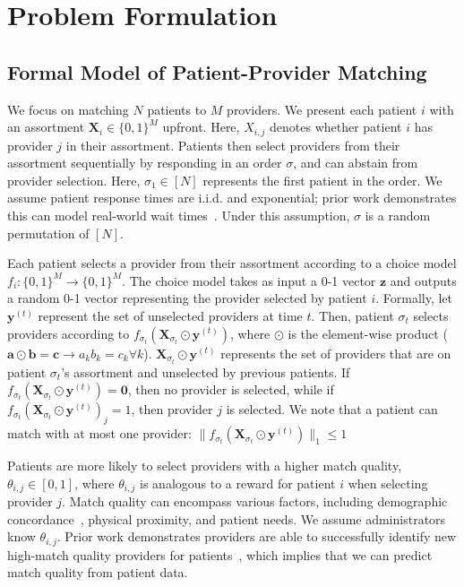 \section{Problem Formulation}
\label{sec:problem}

\subsection{Formal Model of Patient-Provider Matching}
\label{sec:model}
We focus on matching $N$ patients to $M$ providers. 
We present each patient $i$ with an assortment $\mathbf{X}_{i} \in \{0,1\}^{M}$ upfront.
Here, $X_{i,j}$ denotes whether patient $i$ has provider $j$ in their assortment. 
Patients then select providers from their assortment sequentially by responding in an order $\sigma$, and can abstain from provider selection. 
Here, $\sigma_{1} \in [N]$ represents the first patient in the order. 
We assume patient response times are i.i.d. and exponential; prior work demonstrates this can model real-world wait times~\citep{queueing_theory}. 
Under this assumption, $\sigma$ is a random permutation of $[N]$. 

Each patient selects a provider from their assortment according to a choice model $f_{i}: \{0,1\}^{M} \rightarrow \{0,1\}^{M}$. 
The choice model takes as input a 0-1 vector $\mathbf{z}$ and outputs a random 0-1 vector representing the provider selected by patient $i$. 
Formally, let $\mathbf{y}^{(t)}$ represent the set of unselected providers at time $t$. 
Then, patient $\sigma_{t}$ selects providers according to $f_{\sigma_{t}}(\mathbf{X}_{\sigma_{t}} \odot \mathbf{y}^{(t)})$, where $\odot$ is the element-wise product ($\mathbf{a} \odot \mathbf{b} = \mathbf{c} \rightarrow a_{k} b_{k} = c_{k} \forall k$). 
$\mathbf{X}_{\sigma_{t}} \odot \mathbf{y}^{(t)}$ represents the set of providers that are on patient $\sigma_{t}$'s assortment and unselected by previous patients. 
If $f_{\sigma_{t}}(\mathbf{X}_{\sigma_{t}} \odot \mathbf{y}^{(t)}) = \mathbf{0}$, then no provider is selected, while if $f_{\sigma_{t}}(\mathbf{X}_{\sigma_{t}} \odot \mathbf{y}^{(t)})_{j} = 1$, then provider $j$ is selected. 
We note that a patient can match with at most one provider: $\lVert f_{\sigma_{t}}(\mathbf{X}_{\sigma_{t}} \odot \mathbf{y}^{(t)})\rVert_{1} \leq 1$

Patients are more likely to select providers with a higher match quality, $\theta_{i,j} \in [0,1]$, where $\theta_{i,j}$ is analogous to a reward for patient $i$ when selecting provider $j$. 
Match quality can encompass various factors, including demographic concordance~\citep{race_concordance,gender_concordance,language_concordance}, physical proximity, and patient needs.
We assume administrators know $\theta_{i,j}$. Prior work demonstrates providers are able to successfully identify new high-match quality providers for patients~\citep{physician_referral}, which implies that we can predict match quality from patient data.

